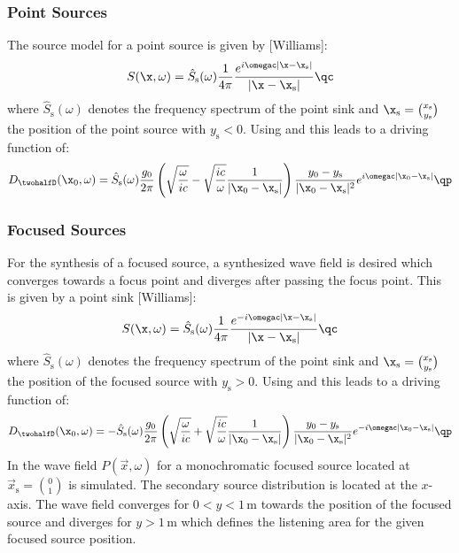 \documentclass{article}
\begin{document}
\subsubsection{Point Sources}
The source model for a point source is given by [Williams]:
\begin{equation} 
    S(\x,\omega) = 
    \hat{S}_\text{s}(\omega)
    \frac{1}{4\pi} \frac{e^{i\omegac|\x-\x_\text{s}|}}{|\x-\x_\text{s}|}
    \qc 
\end{equation}
where $\hat{S}_\text{s}(\omega)$ denotes the frequency spectrum of the point
sink and $\x_\text{s} = \binom{x_\text{s}}{y_\text{s}}$ the position of the
point source with $y_\text{s} < 0$.
Using  and  this leads to a driving function of:
\begin{equation}
    D_\twohalfD(\x_0,\omega) = \hat{S}_\text{s}(\omega)
    \frac{g_0}{2\pi}
    \left( \sqrt{\frac{\omega}{ic}} - \sqrt{\frac{ic}{\omega}} 
    \frac{1}{|\x_0-\x_\text{s}|} \right)
    \frac{y_0-y_\text{s}}{|\x_0-\x_\text{s}|^{2}} 
    e^{i\omegac|\x_0-\x_\text{s}|}
    \qp
    \label{eq:Dps}
\end{equation}


\subsubsection{Focused Sources}

For the synthesis of a focused source, a synthesized wave field is desired which
converges towards a focus point and diverges after passing the focus point.
This is given by a point sink [Williams]:
\begin{equation} 
    S(\x,\omega) = 
    \hat{S}_\text{s}(\omega)
    \frac{1}{4\pi} \frac{e^{-i\omegac|\x-\x_\text{s}|}}{|\x-\x_\text{s}|}
    \qc 
\end{equation}
where $\hat{S}_\text{s}(\omega)$ denotes the frequency spectrum of the point
sink and $\x_\text{s} = \binom{x_\text{s}}{y_\text{s}}$ the position of the
focused source with $y_\text{s} > 0$.
Using  and  this leads to a driving function of:
\begin{equation}
    D_\twohalfD(\x_0,\omega) = -\hat{S}_\text{s}(\omega)
    \frac{g_0}{2\pi}
    \left( \sqrt{\frac{\omega}{ic}} + \sqrt{\frac{ic}{\omega}} 
    \frac{1}{|\x_0-\x_\text{s}|} \right)
    \frac{y_0-y_\text{s}}{|\x_0-\x_\text{s}|^{2}} 
    e^{-i\omegac|\x_0-\x_\text{s}|}
    \qp
    \label{eq:Dfs}
\end{equation}
In  the wave field $P(\vec{x},\omega)$ for
a monochromatic focused
source located at $\vec{x}_\text{s} = \binom{0}{1}$ is simulated. The secondary
source distribution is located at the $x$-axis. The wave field converges for
$0<y<1$\,m towards the position of the focused source and diverges for $y>1$\,m
which defines the listening area for the given focused source position.
\end{document}
